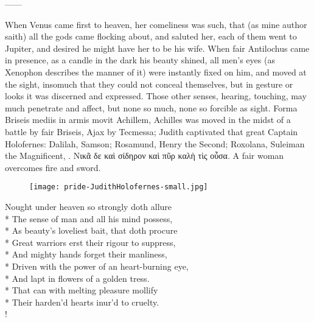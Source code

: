 ------

When Venus came first to heaven, her comeliness was such, that (as mine
author saith) all the gods came flocking about, and saluted her,
each of them went to Jupiter, and desired he might have her to be his
wife. When fair Antilochus came in presence, as a candle in the
dark his beauty shined, all men's eyes (as Xenophon describes the
manner of it) were instantly fixed on him, and moved at the sight,
insomuch that they could not conceal themselves, but in gesture or
looks it was discerned and expressed. Those other senses, hearing,
touching, may much penetrate and affect, but none so much, none so
forcible as sight. Forma Briseis mediis in armis movit Achillem,
Achilles was moved in the midst of a battle by fair Briseis, Ajax by
Tecmessa; Judith captivated that great Captain Holofernes: Dalilah,
Samson; Rosamund, Henry the Second; Roxolana, Suleiman the
Magnificent, \etc{}.
\textgreek[variant=ancient]{Νικᾶ δε καὶ σίδηρον καὶ πῦρ καλὴ τὶς οὖσα.}
A fair woman overcomes fire and sword.

\begin{figure}[tbh]
  \begingroup
  \centering
  \texttt{[image: pride-JudithHolofernes-small.jpg]}
  \label{fig:judithholofernes}
\end{figure}

\begin{versewithlinenos}{2}{1}{1}
Nought under heaven so strongly doth allure\\*
The sense of man and all his mind possess,\\*
As beauty's loveliest bait, that doth procure\\*
Great warriors erst their rigour to suppress,\\*
And mighty hands forget their manliness,\\*
Driven with the power of an heart-burning eye,\\*
And lapt in flowers of a golden tress.\\*
That can with melting pleasure mollify\\*
Their harden'd hearts inur'd to cruelty.\\!
\end{versewithlinenos}%

